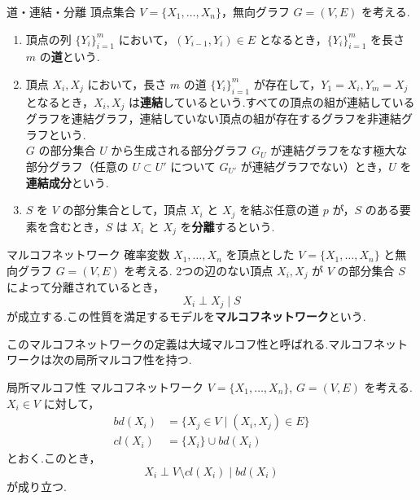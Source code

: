\documentclass[uplatex, dvipdfmx]{jsarticle}
\begin{document}
\begin{defn}{道・連結・分離}
  頂点集合 $V = \{X_1, \dots, X_n\}$，無向グラフ $G = (V, E)$ を考える.
  \begin{enumerate}
      \item 頂点の列 $\{Y_i\}_{i=1}^m$ において，$(Y_{i-1}, Y_i) \in E$ となるとき，$\{Y_i\}_{i=1}^m$ を長さ $m$ の\textbf{道}という.
      \item 頂点 $X_i, X_j$ において，長さ $m$ の道 $\{Y_i\}_{i=1}^m$ が存在して，$Y_1 = X_i, Y_m = X_j$ となるとき，$X_i, X_j$ は\textbf{連結}しているという.すべての頂点の組が連結しているグラフを連結グラフ，連結していない頂点の組が存在するグラフを非連結グラフという.\\
      $G$ の部分集合 $U$ から生成される部分グラフ $G_U$ が連結グラフをなす極大な部分グラフ（任意の $U \subset U'$ について $G_{U'}$ が連結グラフでない）とき，$U$ を\textbf{連結成分}という.
      \item $S$ を $V$ の部分集合として，頂点 $X_i$ と $X_j$ を結ぶ任意の道 $p$ が，$S$ のある要素を含むとき，$S$ は $X_i$ と $X_j$ を\textbf{分離}するという.
  \end{enumerate}
  \end{defn}

  \begin{defn}{マルコフネットワーク}
  確率変数 $X_1, \dots, X_n$ を頂点とした $V = \{X_1, \dots, X_n\}$ と無向グラフ $G = (V, E)$ を考える.
  2つの辺のない頂点 $X_i, X_j$ が $V$ の部分集合 $S$ によって分離されているとき，
  \begin{equation}
      X_i \perp X_j \mid S
  \end{equation}
  が成立する.この性質を満足するモデルを\textbf{マルコフネットワーク}という.
\end{defn}

このマルコフネットワークの定義は大域マルコフ性と呼ばれる.マルコフネットワークは次の局所マルコフ性を持つ.

\begin{prop}{局所マルコフ性}
  マルコフネットワーク $V = \{X_1, \dots, X_n\}$, $G = (V, E)$ を考える.$X_i \in V$ に対して，
  \begin{align*}
      bd(X_i) &= \{X_j \in V \mid (X_i, X_j) \in E\} \\
      cl(X_i) &= \{X_i\} \cup bd(X_i)
  \end{align*}
  とおく.このとき，
  \begin{equation}
      X_i \perp V \setminus cl(X_i) \mid bd(X_i)
  \end{equation}
  が成り立つ.
\end{prop}
\end{document}
